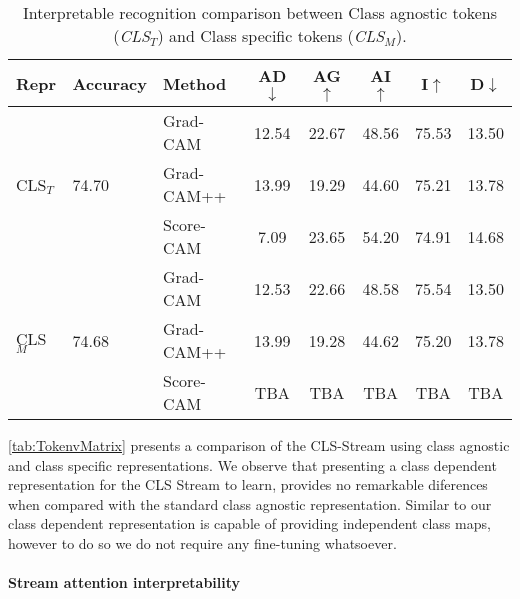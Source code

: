 \begin{table}
\centering
\scriptsize
\setlength{\tabcolsep}{2.5pt}
\begin{tabular}{lllccccc}\toprule                    
	Repr&Accuracy&Method&AD$\downarrow$&AG$\uparrow$&AI$\uparrow$&I$\uparrow$&D$\downarrow$\\\midrule
	\multirow{3}{*}{CLS$_T$}&\multirow{3}{*}{74.70}&Grad-CAM&12.54&22.67&48.56&75.53&13.50\\
		& &Grad-CAM++&13.99&19.29&44.60&75.21&13.78\\
		& &Score-CAM&7.09&23.65&54.20&74.91&14.68\\\midrule
		\multirow{3}{*}{CLS$_M$}&\multirow{3}{*}{74.68}&Grad-CAM&12.53&22.66&48.58&75.54&13.50\\
		& &Grad-CAM++&13.99&19.28&44.62&75.20&13.78\\
		& &Score-CAM&TBA&TBA&TBA&TBA&TBA\\\bottomrule
\end{tabular}
\vspace{3pt}
\caption{Interpretable recognition comparison between Class agnostic tokens (\emph{CLS$_T$}) and Class specific tokens (\emph{CLS$_M$}).}
\label{tab:TokenvMatrix}
\end{table}

\autoref{tab:TokenvMatrix} presents a comparison of the CLS-Stream using class agnostic and class specific representations. We observe that presenting a class dependent representation for the CLS Stream to learn, provides no remarkable diferences when compared with the standard class agnostic representation. Similar to \cite{touvron2021augmenting} our class dependent representation is capable of providing independent class maps, however to do so we do not require any fine-tuning whatsoever. 


\paragraph{Stream attention interpretability}


